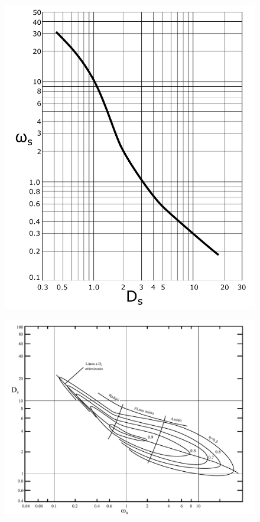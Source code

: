 \begin{figure}
\centering
\begin{minipage}{.5\textwidth}
  \centering
  \includegraphics[width=.95\linewidth]{fig/cord_diag.pdf}
  \label{fig:cord_diag}
\end{minipage}%
\begin{minipage}{.5\textwidth}
  \centering
  \includegraphics[width=.95\linewidth]{fig/primo_3.pdf}
  \label{fig:primo_3}
\end{minipage}
\end{figure}

